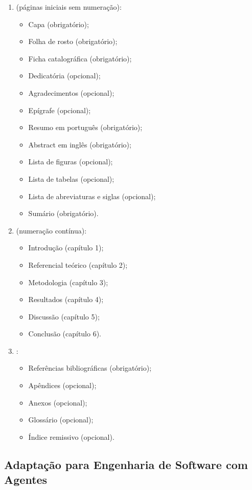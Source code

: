 \begin{enumerate}
\item {} (páginas iniciais sem numeração):
    \begin{itemize}
    \item Capa (obrigatório);
    \item Folha de rosto (obrigatório);
    \item Ficha catalográfica (obrigatório);
    \item Dedicatória (opcional);
    \item Agradecimentos (opcional);
    \item Epígrafe (opcional);
    \item Resumo em português (obrigatório);
    \item Abstract em inglês (obrigatório);
    \item Lista de figuras (opcional);
    \item Lista de tabelas (opcional);
    \item Lista de abreviaturas e siglas (opcional);
    \item Sumário (obrigatório).
    \end{itemize}
\item {} (numeração contínua):
    \begin{itemize}
    \item Introdução (capítulo 1);
    \item Referencial teórico (capítulo 2);
    \item Metodologia (capítulo 3);
    \item Resultados (capítulo 4);
    \item Discussão (capítulo 5);
    \item Conclusão (capítulo 6).
    \end{itemize}
\item {}:
    \begin{itemize}
    \item Referências bibliográficas (obrigatório);
    \item Apêndices (opcional);
    \item Anexos (opcional);
    \item Glossário (opcional);
    \item Índice remissivo (opcional).
    \end{itemize}
\end{enumerate}

\subsection{Adaptação para Engenharia de Software com Agentes}

